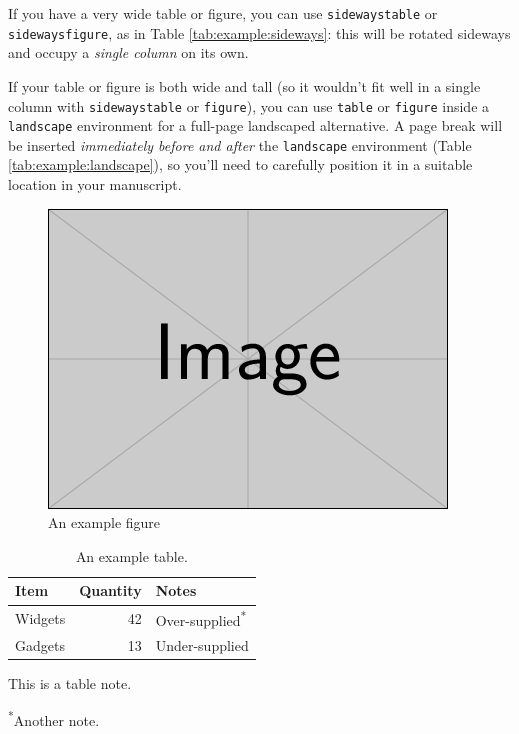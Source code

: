 \documentclass[a4paper,num-refs]{oup-contemporary}
\begin{document}
If you have a very wide table or figure, you can use \texttt{sidewaystable} or \texttt{sidewaysfigure}, as in Table \ref{tab:example:sideways}: this will be rotated sideways and occupy a \emph{single column} on its own.

If your table or figure is both wide and tall (so it wouldn't fit well in a single column with \texttt{sidewaystable} or \texttt{figure}),
you can use \verb|table| or \verb|figure| inside a \verb|landscape| environment for a full-page landscaped alternative. A page break will be inserted \emph{immediately before and after} the \verb|landscape| environment (Table \ref{tab:example:landscape}), so you'll need to carefully position it in a suitable location in your manuscript.

\begin{figure}[bt!] %
\centering
\includegraphics[width=\linewidth]{example-image}
\caption{An example figure}\label{fig:example}
\end{figure}

\begin{table}[bt!]
\caption{An example table.}\label{tab:example}
\begin{tabular}{l r l}
\toprule
Item & Quantity & Notes\\
\midrule
Widgets & 42 & Over-supplied\textsuperscript{*} \\
Gadgets & 13 & Under-supplied \\
\bottomrule
\end{tabular}
\begin{tablenotes}
\item This is a table note.
\item \textsuperscript{*}Another note.
\end{tablenotes}
\end{table}
\end{document}

